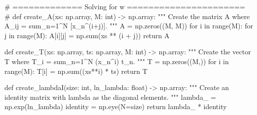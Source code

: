 \documentclass[
  0.875em,
  letterpaper,
  DIV=11,
  numbers=noendperiod]{scrartcl}
\newenvironment{Shaded}{\begin{snugshade}}{\end{snugshade}}
\newcommand{\BuiltInTok}[1]{\textcolor[rgb]{0.00,0.23,0.31}{#1}}
\newcommand{\CommentTok}[1]{\textcolor[rgb]{0.37,0.37,0.37}{#1}}
\newcommand{\ControlFlowTok}[1]{\textcolor[rgb]{0.00,0.23,0.31}{#1}}
\newcommand{\KeywordTok}[1]{\textcolor[rgb]{0.00,0.23,0.31}{#1}}
\newcommand{\NormalTok}[1]{\textcolor[rgb]{0.00,0.23,0.31}{#1}}
\newcommand{\OperatorTok}[1]{\textcolor[rgb]{0.37,0.37,0.37}{#1}}
\begin{document}
\begin{Shaded}
\begin{Highlighting}[]
\CommentTok{\# ============= Solving for w ====================== \#}
\KeywordTok{def}\NormalTok{ create\_A(xs: np.array, M: }\BuiltInTok{int}\NormalTok{) }\OperatorTok{{-}\textgreater{}}\NormalTok{ np.array:}
    \CommentTok{"""}
\CommentTok{    Create the matrix A where A\_ij = sum\_n=1\^{}N [x\_n\^{}(i+j)].}
\CommentTok{    """}
\NormalTok{    A }\OperatorTok{=}\NormalTok{ np.zeros((M, M))}
    \ControlFlowTok{for}\NormalTok{ i }\KeywordTok{in} \BuiltInTok{range}\NormalTok{(M):}
        \ControlFlowTok{for}\NormalTok{ j }\KeywordTok{in} \BuiltInTok{range}\NormalTok{(M):}
\NormalTok{            A[i][j] }\OperatorTok{=}\NormalTok{ np.}\BuiltInTok{sum}\NormalTok{(xs }\OperatorTok{**}\NormalTok{ (i }\OperatorTok{+}\NormalTok{ j))}
    \ControlFlowTok{return}\NormalTok{ A}


\KeywordTok{def}\NormalTok{ create\_T(xs: np.array, ts: np.array, M: }\BuiltInTok{int}\NormalTok{) }\OperatorTok{{-}\textgreater{}}\NormalTok{ np.array:}
    \CommentTok{"""}
\CommentTok{    Create the vector T where T\_i = sum\_n=1\^{}N (x\_n\^{}i) t\_n.}
\CommentTok{    """}
\NormalTok{    T }\OperatorTok{=}\NormalTok{ np.zeros((M,))}
    \ControlFlowTok{for}\NormalTok{ i }\KeywordTok{in} \BuiltInTok{range}\NormalTok{(M):}
\NormalTok{        T[i] }\OperatorTok{=}\NormalTok{ np.}\BuiltInTok{sum}\NormalTok{((xs}\OperatorTok{**}\NormalTok{i) }\OperatorTok{*}\NormalTok{ ts)}
    \ControlFlowTok{return}\NormalTok{ T}


\KeywordTok{def}\NormalTok{ create\_lambdaI(size: }\BuiltInTok{int}\NormalTok{, ln\_lambda: }\BuiltInTok{float}\NormalTok{) }\OperatorTok{{-}\textgreater{}}\NormalTok{ np.array:}
    \CommentTok{"""}
\CommentTok{    Create an identity matrix with lambda as the diagonal elements.}
\CommentTok{    """}
\NormalTok{    lambda\_ }\OperatorTok{=}\NormalTok{ np.exp(ln\_lambda)}
\NormalTok{    identity }\OperatorTok{=}\NormalTok{ np.eye(N}\OperatorTok{=}\NormalTok{size)}
    \ControlFlowTok{return}\NormalTok{ lambda\_ }\OperatorTok{*}\NormalTok{ identity}



\end{Highlighting}
\end{Shaded}
\end{document}
